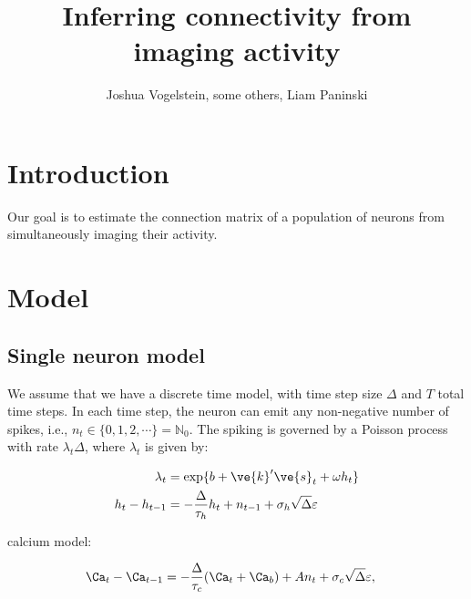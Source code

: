 \documentclass[12pt]{article}
\title{Inferring connectivity from imaging activity}
\author{Joshua Vogelstein, some others,  Liam Paninski}
\begin{document}
\maketitle

%
%
\section{Introduction}

Our goal is to estimate the connection matrix of a population of neurons from simultaneously imaging their activity. 

\section{Model}

\subsection{Single neuron model}

We assume that we have a discrete time model, with time step size $\Delta$ and $T$ total time steps. In each time step, the neuron can emit any non-negative number of spikes, i.e., $n_t \in \{0,1,2,\cdots\}=\mathbb{N}_0$.  The spiking is governed by a Poisson process with rate $\lambda_t \Delta$, where $\lambda_t$ is given by: 

\begin{align} \label{eq:1neur}
\lambda_t &= \exp\{b + \ve{k}' \ve{s}_t + \omega h_t\} \\
h_t - h_{t-1}&= - \frac{\Delta}{\tau_h} h_t + n_{t-1} + \sigma_h \sqrt{\Delta} \varepsilon
\end{align} 


calcium model:

\begin{align}
\Ca_t - \Ca_{t-1} &= -\frac{\Delta}{\tau_c}(\Ca_t + \Ca_b) + A n_t + \sigma_c \sqrt{\Delta} \varepsilon, 
\end{align}
\end{document}
